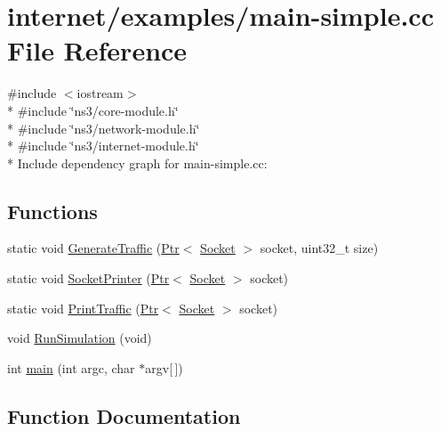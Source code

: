 \hypertarget{main-simple_8cc}{}\section{internet/examples/main-\/simple.cc File Reference}
\label{main-simple_8cc}
{\ttfamily \#include $<$iostream$>$}\\*
{\ttfamily \#include \char`\"{}ns3/core-\/module.\+h\char`\"{}}\\*
{\ttfamily \#include \char`\"{}ns3/network-\/module.\+h\char`\"{}}\\*
{\ttfamily \#include \char`\"{}ns3/internet-\/module.\+h\char`\"{}}\\*
Include dependency graph for main-\/simple.cc\+:
\subsection*{Functions}
\begin{DoxyCompactItemize}
\item 
static void \hyperlink{main-simple_8cc_a56b0a2c40ec28496e4ff380c68b676f3}{Generate\+Traffic} (\hyperlink{classns3_1_1Ptr}{Ptr}$<$ \hyperlink{classns3_1_1Socket}{Socket} $>$ socket, uint32\+\_\+t size)
\item 
static void \hyperlink{main-simple_8cc_acce2c9a2db7d3bf40642912ba18879a2}{Socket\+Printer} (\hyperlink{classns3_1_1Ptr}{Ptr}$<$ \hyperlink{classns3_1_1Socket}{Socket} $>$ socket)
\item 
static void \hyperlink{main-simple_8cc_a40304eb8f75bad7bdc7e6a619f55e266}{Print\+Traffic} (\hyperlink{classns3_1_1Ptr}{Ptr}$<$ \hyperlink{classns3_1_1Socket}{Socket} $>$ socket)
\item 
void \hyperlink{main-simple_8cc_aae4a035f2107d100249164fe508bac66}{Run\+Simulation} (void)
\item 
int \hyperlink{main-simple_8cc_a0ddf1224851353fc92bfbff6f499fa97}{main} (int argc, char $\ast$argv\mbox{[}$\,$\mbox{]})
\end{DoxyCompactItemize}


\subsection{Function Documentation}
